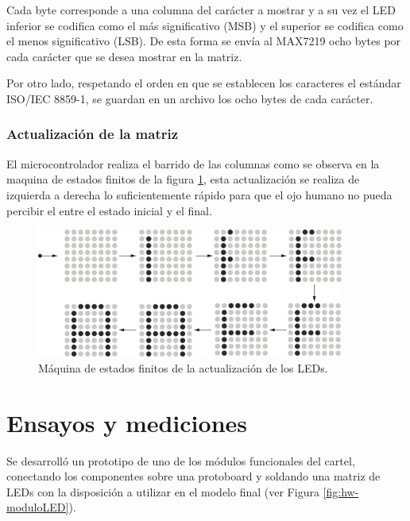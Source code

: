Cada byte corresponde a una columna del carácter a mostrar y a su vez el LED inferior se codifica como el más significativo (MSB) y el superior se codifica como el menos significativo (LSB). De esta forma se envía al MAX7219 ocho bytes por cada carácter que se desea mostrar en la matriz.

Por otro lado, respetando el orden en que se establecen los caracteres el estándar ISO/IEC 8859-1, se guardan en un archivo los ocho bytes de cada carácter.

\subsubsection{Actualización de la matriz}

El microcontrolador realiza el barrido de las columnas como se observa en la maquina de estados finitos de la figura \ref{fig:fsm-matriz}, esta actualización se realiza de izquierda a derecha lo suficientemente rápido para que el ojo humano no pueda percibir el entre el estado inicial y el final. 

\begin{figure}[ht!]
	\begin{center}
		\centering
		\includegraphics[width=0.9\textwidth]{imagenes/hw/estadosRefresh.pdf}
		\caption{Máquina de estados finitos de la actualización de los LEDs.}
		\label{fig:fsm-matriz}
	\end{center}
\end{figure}

\section{Ensayos y mediciones}
Se desarrolló un prototipo de uno de los módulos funcionales del cartel, conectando los componentes sobre una protoboard y soldando una matriz de LEDs con la disposición a utilizar en el modelo final (ver Figura \ref{fig:hw-moduloLED}).

